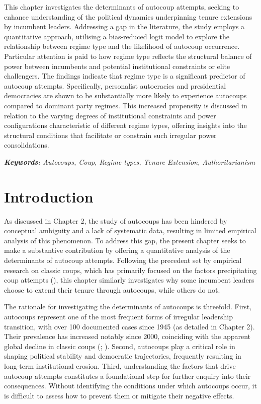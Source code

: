 \documentclass[
  12pt,
]{report}
\begin{document}
This chapter investigates the determinants of autocoup attempts, seeking
to enhance understanding of the political dynamics underpinning tenure
extensions by incumbent leaders. Addressing a gap in the literature, the
study employs a quantitative approach, utilising a bias-reduced logit
model to explore the relationship between regime type and the likelihood
of autocoup occurrence. Particular attention is paid to how regime type
reflects the structural balance of power between incumbents and
potential institutional constraints or elite challengers. The findings
indicate that regime type is a significant predictor of autocoup
attempts. Specifically, personalist autocracies and presidential
democracies are shown to be substantially more likely to experience
autocoups compared to dominant party regimes. This increased propensity
is discussed in relation to the varying degrees of institutional
constraints and power configurations characteristic of different regime
types, offering insights into the structural conditions that facilitate
or constrain such irregular power consolidations.

\emph{\textbf{Keywords:} Autocoups, Coup, Regime types, Tenure
Extension, Authoritarianism}

\newpage

\section{Introduction}\label{introduction-2}

As discussed in Chapter 2, the study of autocoups has been hindered by
conceptual ambiguity and a lack of systematic data, resulting in limited
empirical analysis of this phenomenon. To address this gap, the present
chapter seeks to make a substantive contribution by offering a
quantitative analysis of the determinants of autocoup attempts.
Following the precedent set by empirical research on classic coups,
which has primarily focused on the factors precipitating coup attempts
(), this
chapter similarly investigates why some incumbent leaders choose to
extend their tenure through autocoups, while others do not.

The rationale for investigating the determinants of autocoups is
threefold. First, autocoups represent one of the most frequent forms of
irregular leadership transition, with over 100 documented cases since
1945 (as detailed in Chapter 2). Their prevalence has increased notably
since 2000, coinciding with the apparent global decline in classic coups
(; ). Second, autocoups play a critical role in shaping
political stability and democratic trajectories, frequently resulting in
long-term institutional erosion. Third, understanding the factors that
drive autocoup attempts constitutes a foundational step for further
enquiry into their consequences. Without identifying the conditions
under which autocoups occur, it is difficult to assess how to prevent
them or mitigate their negative effects.
\end{document}
